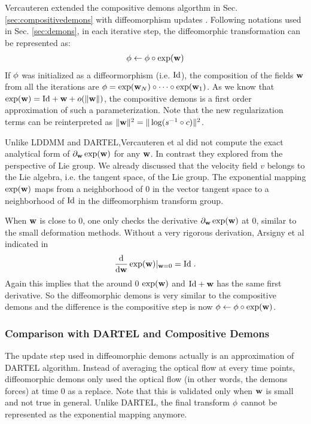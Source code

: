 \documentclass[letterpaper,12pt]{article}
\begin{document}
Vercauteren extended the compositive demons algorthm in Sec. \ref{sec:compositivedemons} with diffeomorphism updates \cite{Vercauteren2009}. Following notations used in Sec. \ref{sec:demons}, in each iterative step, the diffeomorphic transformation can be represented as:
\begin{align}
\phi \leftarrow \phi \circ \exp(\mathbf{w})
\end{align}
If $\phi$ was initialized as a diffeormorphism (i.e. $\text{Id}$), the composition of the fields $\mathbf{w}$ from all the iterations are $\phi = \exp(\mathbf{w}_N) \circ \cdots \circ \exp(\mathbf{w}_1)$. As we know that $\exp(\mathbf{w}) = \text{Id} + \mathbf{w} + o(\|\mathbf{w}\|)$, the compositive demons is a first order approximation of such a parameterization. 
Note that the new regularization terms can be reinterpreted as $\| \mathbf{w} \|^2 = \| \log(s^{-1} \circ c )\|^2$.

Unlike LDDMM and DARTEL,Vercauteren et al did not compute the exact analytical form of $\partial_{\mathbf{w}} \exp(\mathbf{w})$ for any $\mathbf{w}$. In contrast they explored from the perspective of Lie group. We already discussed that the velocity field $v$ belongs to the Lie algebra, i.e. the tangent space, of the Lie group. The exponential mapping $\exp(\mathbf{w})$ maps from a neighborhood of $0$ in the vector tangent space to a neighborhood of $\text{Id}$ in the diffeomorphism transform group. 

When $\mathbf{w}$ is close to $0$, one only checks the derivative $\partial_{\mathbf{w}}\exp(\mathbf{w})$ at $0$, similar to the small deformation methods. Without a very rigorous derivation, Arsigny et al indicated in \cite{Arsigny2006} 
\begin{align}
\frac{\text{d}}{\text{d}\mathbf{w}} \exp(\mathbf{w}) \rvert_{\mathbf{w}=0} = \text{Id} \; .
\end{align}
Again this implies that the around 0 $\exp(\mathbf{w})$ and $\text{Id}+\mathbf{w}$ has the same first derivative. So the diffeomorphic demons is very similar to the compositive demons and the difference is the compositive step is now $\phi \leftarrow \phi \circ \exp(\mathbf{w})$. 

\subsubsection{Comparison with DARTEL and Compositive Demons}

The update step used in diffeomorphic demons actually is an approximation of DARTEL algorithm. Instead of averaging the optical flow at every time points, diffeomorphic demons only used the optical flow (in other words, the demons forces) at time $0$ as a replace. Note that this is validated only when $\mathbf{w}$ is small and not true in general. Unlike DARTEL, the final transform $\phi$ cannot be represented as the exponential mapping anymore.
\end{document}
